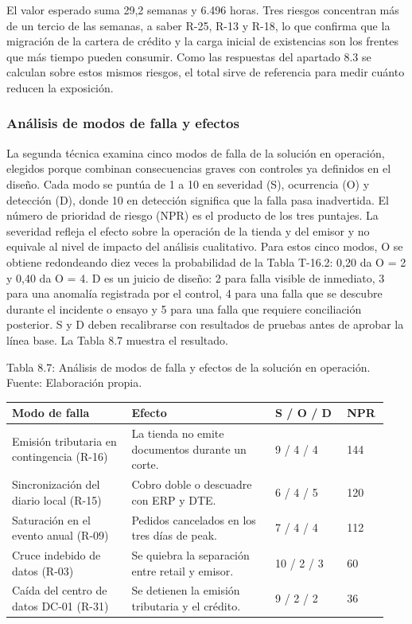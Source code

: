 \documentclass[11pt]{article}
\begin{document}
El valor esperado suma 29,2 semanas y 6.496 horas. Tres riesgos concentran más de un tercio de las semanas, a saber R-25, R-13 y R-18, lo que confirma que la migración de la cartera de crédito y la carga inicial de existencias son los frentes que más tiempo pueden consumir. Como las respuestas del apartado 8.3 se calculan sobre estos mismos riesgos, el total sirve de referencia para medir cuánto reducen la exposición.

\subsubsection{Análisis de modos de falla y efectos}

La segunda técnica examina cinco modos de falla de la solución en operación, elegidos porque combinan consecuencias graves con controles ya definidos en el diseño. Cada modo se puntúa de 1 a 10 en severidad (S), ocurrencia (O) y detección (D), donde 10 en detección significa que la falla pasa inadvertida. El número de prioridad de riesgo (NPR) es el producto de los tres puntajes. La severidad refleja el efecto sobre la operación de la tienda y del emisor y no equivale al nivel de impacto del análisis cualitativo. Para estos cinco modos, O se obtiene redondeando diez veces la probabilidad de la Tabla T-16.2: 0,20 da O = 2 y 0,40 da O = 4. D es un juicio de diseño: 2 para falla visible de inmediato, 3 para una anomalía registrada por el control, 4 para una falla que se descubre durante el incidente o ensayo y 5 para una falla que requiere conciliación posterior. S y D deben recalibrarse con resultados de pruebas antes de aprobar la línea base. La Tabla 8.7 muestra el resultado.

Tabla 8.7: Análisis de modos de falla y efectos de la solución en operación. Fuente: Elaboración propia.\label{tab:8-7}

\begin{longtable}{p{0.30\linewidth}p{0.36\linewidth}p{0.18\linewidth}p{0.10\linewidth}}
\toprule
\textbf{Modo de falla} & \textbf{Efecto} & \textbf{S / O / D} & \textbf{NPR} \\
\midrule
\endhead
\bottomrule
\endlastfoot
Emisión tributaria en contingencia (R-16) & La tienda no emite documentos durante un corte. & 9 / 4 / 4 & 144 \\
Sincronización del diario local (R-15) & Cobro doble o descuadre con ERP y DTE. & 6 / 4 / 5 & 120 \\
Saturación en el evento anual (R-09) & Pedidos cancelados en los tres días de peak. & 7 / 4 / 4 & 112 \\
Cruce indebido de datos (R-03) & Se quiebra la separación entre retail y emisor. & 10 / 2 / 3 & 60 \\
Caída del centro de datos DC-01 (R-31) & Se detienen la emisión tributaria y el crédito. & 9 / 2 / 2 & 36 \\
\end{longtable}
\end{document}

